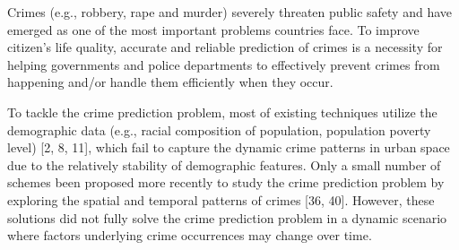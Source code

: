 Crimes (e.g., robbery, rape and murder) severely threaten public
safety and have emerged as one of the most important problems
countries face. To improve citizen’s life quality, accurate and reliable
prediction of crimes is a necessity for helping governments and
police departments to effectively prevent crimes from happening
and/or handle them efficiently when they occur.

\noindent To tackle the crime prediction problem, most of existing techniques utilize the demographic data (e.g., racial composition of
population, population poverty level)\cite{p1} [2, 8, 11], which fail to capture the dynamic crime patterns in urban space due to the relatively
stability of demographic features. Only a small number of schemes
been proposed more recently to study the crime prediction problem
by exploring the spatial and temporal patterns of crimes [36, 40].
However, these solutions did not fully solve the crime prediction
problem in a dynamic scenario where factors underlying crime
occurrences may change over time.

